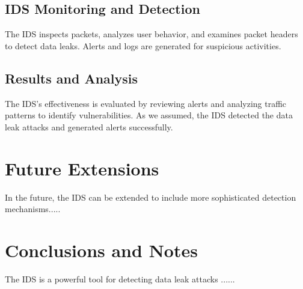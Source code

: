 \documentclass{article}
\begin{document}
\subsection{IDS Monitoring and Detection}
The IDS inspects packets, analyzes user behavior, and examines packet headers to detect data leaks. Alerts and logs are generated for suspicious activities.

\subsection{Results and Analysis}
The IDS's effectiveness is evaluated by reviewing alerts and analyzing traffic patterns to identify vulnerabilities.
As we assumed, the IDS detected the data leak attacks and generated alerts successfully.

\section{Future Extensions}
In the future, the IDS can be extended to include more sophisticated detection mechanisms.....

\section{Conclusions and Notes}
The IDS is a powerful tool for detecting data leak attacks ...... 

\appendix
\end{document}

